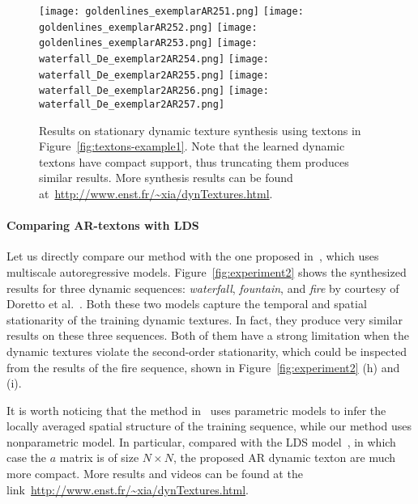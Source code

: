 \begin{figure*}[ht!]
{  \texttt{[image: goldenlines\_exemplarAR251.png]}
  \texttt{[image: goldenlines\_exemplarAR252.png]}
  \texttt{[image: goldenlines\_exemplarAR253.png]}
  \texttt{[image: waterfall\_De\_exemplar2AR254.png]}
  \texttt{[image: waterfall\_De\_exemplar2AR255.png]}
  \texttt{[image: waterfall\_De\_exemplar2AR256.png]}
  \texttt{[image: waterfall\_De\_exemplar2AR257.png]}
}\\
\caption{\small Results on stationary dynamic texture synthesis using textons in Figure~\ref{fig:textons-example1}. Note that the learned dynamic textons have compact support, thus truncating them produces similar results. More synthesis results can be found at~\url{http://www.enst.fr/~xia/dynTextures.html}. }
\label{fig:example1}
\end{figure*}

\paragraph{Comparing AR-textons with LDS~\cite{Doretto04spatiallyhomogeneous}}
Let us directly compare our method with the one proposed in~\cite{Doretto04spatiallyhomogeneous}, which uses multiscale autoregressive models.
Figure~\ref{fig:experiment2} shows the synthesized results for three dynamic sequences: {\it waterfall}, {\it fountain}, and {\it fire} by courtesy of Doretto et al.~\cite{Doretto04spatiallyhomogeneous}.
Both these two models capture the temporal and spatial stationarity of the training dynamic textures. In fact, they produce very similar results on these three sequences. Both of them have a strong limitation when the dynamic textures violate the second-order stationarity, which could be inspected from the results of the fire sequence, shown in Figure~\ref{fig:experiment2} (h) and (i).

It is worth noticing that the method in~\cite{Doretto04spatiallyhomogeneous} uses parametric models to infer the locally averaged  spatial structure of the training sequence, while our method uses nonparametric model.
In particular, compared with the LDS model~\cite{Doretto04spatiallyhomogeneous}, in which case the $a$ matrix is of size $N \times N$, the proposed AR dynamic texton are much more compact. More results and videos can be found at the link~\url{http://www.enst.fr/~xia/dynTextures.html}.


